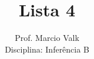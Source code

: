 \documentclass[10pt,brazil,addpoints]{exam}
\begin{document}
\title{Lista 4 }


\author{
  Prof. Marcio Valk \\
  Disciplina: Inferência B\\
  \date{}
}


\maketitle
\end{document}
